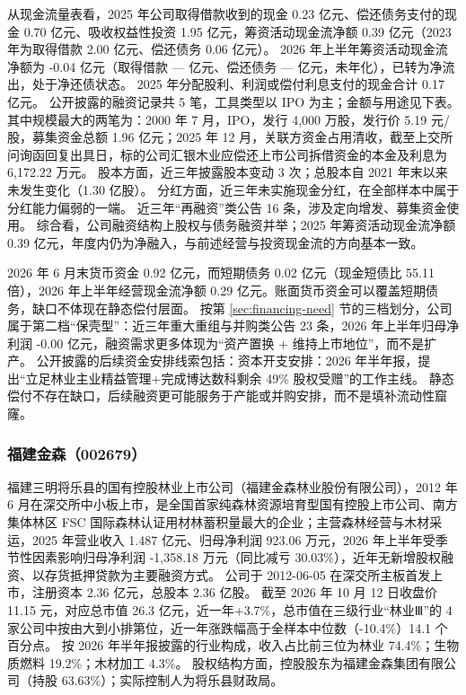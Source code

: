  从现金流量表看，2025 年公司取得借款收到的现金 0.23 亿元、偿还债务支付的现金 0.70 亿元、吸收权益性投资 1.95 亿元，筹资活动现金流净额 0.39 亿元（2023 年为取得借款 2.00 亿元、偿还债务 0.06 亿元）。 2026 年上半年筹资活动现金流净额为 -0.04 亿元（取得借款 — 亿元、偿还债务 — 亿元，未年化），已转为净流出，处于净还债状态。 2025 年分配股利、利润或偿付利息支付的现金合计 0.17 亿元。 公开披露的融资记录共 5 笔，工具类型以 IPO 为主；金额与用途见下表。 其中规模最大的两笔为：2000 年 7 月，IPO，发行 4,000 万股，发行价 5.19 元/股，募集资金总额 1.96 亿元；2025 年 12 月，关联方资金占用清收，截至上交所问询函回复出具日，标的公司汇银木业应偿还上市公司拆借资金的本金及利息为 6,172.22 万元。 股本方面，近三年披露股本变动 3 次；总股本自 2021 年末以来未发生变化（1.30 亿股）。 分红方面，近三年未实施现金分红，在全部样本中属于分红能力偏弱的一端。 近三年“再融资”类公告 16 条，涉及定向增发、募集资金使用。 综合看，公司融资结构上股权与债务融资并举；2025 年筹资活动现金流净额 0.39 亿元，年度内仍为净融入，与前述经营与投资现金流的方向基本一致。

 2026 年 6 月末货币资金 0.92 亿元，而短期债务 0.02 亿元（现金短债比 55.11 倍），2026 年上半年经营现金流净额 0.29 亿元。账面货币资金可以覆盖短期债务，缺口不体现在静态偿付层面。 按第 \ref{sec:financing-need} 节的三档划分，公司属于第二档“保壳型”：近三年重大重组与并购类公告 23 条，2026 年上半年归母净利润 -0.00 亿元，融资需求更多体现为“资产置换 + 维持上市地位”，而不是扩产。 公开披露的后续资金安排线索包括：资本开支安排：2026 年半年报，提出“立足林业主业精益管理+完成博达数科剩余 49\% 股权受赠”的工作主线。 静态偿付不存在缺口，后续融资更可能服务于产能或并购安排，而不是填补流动性窟窿。




\subsubsection{福建金森（002679）}
\label{co:002679}

 福建三明将乐县的国有控股林业上市公司（福建金森林业股份有限公司），2012 年 6 月在深交所中小板上市，是全国首家纯森林资源培育型国有控股上市公司、南方集体林区 FSC 国际森林认证用材林蓄积量最大的企业；主营森林经营与木材采运，2025 年营业收入 1.487 亿元、归母净利润 923.06 万元，2026 年上半年受季节性因素影响归母净利润 -1,358.18 万元（同比减亏 30.03\%），近年无新增股权融资、以存货抵押贷款为主要融资方式。 公司于 2012-06-05 在深交所主板首发上市，注册资本 2.36 亿元，总股本 2.36 亿股。 截至 2026 年 10 月 12 日收盘价 11.15 元，对应总市值 26.3 亿元，近一年+3.7\%，总市值在三级行业“林业Ⅲ”的 4 家公司中按由大到小排第位，近一年涨跌幅高于全样本中位数（-10.4\%）14.1 个百分点。 按 2026 年半年报披露的行业构成，收入占比前三位为林业 74.4\%；生物质燃料 19.2\%；木材加工 4.3\%。 股权结构方面，控股股东为福建金森集团有限公司（持股 63.63\%）；实际控制人为将乐县财政局。

